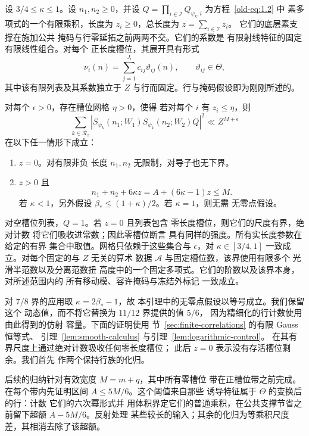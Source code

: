 \begin{lemma}[带短素因子的四阶矩]\label{lem:plain}
设 \(3/4\le\kappa\le1\)。设 \(n_1,n_2\ge0\)，并设
\(Q=\prod_{i\in\mathcal I}Q_{\psi_k,i}\) 为方程~\eqref{old-eq:1.2} 中
素多项式的一个有限乘积，长度为
\(z_i\ge0\)，总长度为 \(z=\sum_{i\in\mathcal I}z_i\)。
它们的底层素支撑在施加公共
掩码与行零延拓之前两两不交。它们的系数是
有限射线特征的固定有限线性组合。对每个
正长度槽位，其展开具有形式
\[
 \nu_i(n)=\sum_{j=1}^{J_i}c_{ij}\vartheta_{ij}(n),
 \qquad\vartheta_{ij}\in\Theta,
\]
其中该有限列表及其系数独立于
\(Z\) 与行而固定。行与掩码假设即为刚刚所述的。

对每个 \(\epsilon>0\)，存在槽位网格 \(\eta>0\)，使得
若对每个 \(i\) 有 \(z_i\le\eta\)，则
\begin{equation}
 \sum_{k\in\mathcal R_z}
 \left|S_{\psi_k}(n_1;W_1)S_{\psi_k}(n_2;W_2)Q\right|^2
 \ll Z^{M+\epsilon}
 \label{old-eq:2.1}
\end{equation}
在以下任一情形下成立：
\begin{enumerate}
\item \(z=0\)。对有限非负
      长度 \(n_1,n_2\) 无限制，对导子也无下界。
\item \(z>0\) 且
\begin{equation}
 n_1+n_2+6\kappa z=A+(6\kappa-1)z\le M.
 \label{old-eq:3.9}
\end{equation}
      若 \(\kappa<1\)，另外假设
      \(\beta_*\le(1+\kappa)/2\)。若 \(\kappa=1\)，则无需
      无零点假设。
\end{enumerate}
对空槽位列表，\(Q=1\)。若 \(z=0\) 且列表包含
零长度槽位，则它们的尺度有界，绝对计数
将它们吸收进常数；因此零槽位断言
具有同样的强度。所有实长度参数在给定的有界
集合中取值。网格只依赖于这些集合与 \(\epsilon\)，对
\(\kappa\in[3/4,1]\) 一致成立。对每个固定的与 \(Z\) 无关的算术
数据 \(\mathcal A\) 与固定槽位数，该界使用有限多个
光滑半范数以及分离范数扭
高度中的一个固定多项式。它们的阶数以及该界本身，对所述范围内的
所有移动模、容许掩码与冻结外标记
一致成立。
\end{lemma}

对 \(7/8\) 界的应用取 \(\kappa=2\beta_*-1\)，故
本引理中的无零点假设以等号成立。我们保留这个
动态值，而不将它替换为 \(11/12\) 界提供的值 \(5/6\)，
因为精细化的行计数使用由此得到的仿射
容量。下面的证明使用
节~\ref{sec:finite-correlations} 的有限 Gauss 恒等式、
引理~\ref{lem:smooth-calculus} 与引理~\ref{lem:logarithmic-control}。
在其有界尺度上通过绝对计数吸收任何零长度槽位；
此后 \(z=0\) 表示没有存活槽位剩余。我们首先
作两个保持行族的化归。

后续的归纳针对有效宽度 \(M=m+q\)，其中所有零槽位
带在正槽位带之前完成。在每个带内先证明区间
\(A\le5M/6\)。这个阈值来自那些
诱导特征属于 \(\Theta\) 的变换后的行：计数
它们的六次幂形式并
用体积界定它们的普通乘积，在公共支撑节省之前留下超额
\(A-5M/6\)。反射处理
某些较长的输入；其余的化归为等乘积尺度
差，其相消去除了该超额。

